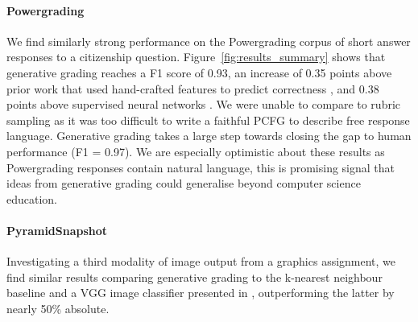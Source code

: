 
\paragraph{Powergrading}  We find similarly strong performance on the Powergrading corpus of short answer responses to a citizenship question. Figure~\ref{fig:results_summary} shows that generative grading reaches a F1 score of 0.93, an increase of 0.35 points above prior work that used hand-crafted features to predict correctness \cite{daxenberger2014dkpro}, and 0.38 points above supervised neural networks \cite{riordan2017investigating}. We were unable to compare to rubric sampling \cite{wu2018beyond} as it was too difficult to write a faithful PCFG to describe free response language. Generative grading takes a large step towards closing the gap to human performance (F1 = 0.97). We are especially optimistic about these results as Powergrading responses contain natural language, this is promising signal that ideas from generative grading could generalise beyond computer science education.

\paragraph{PyramidSnapshot} Investigating a third modality of image output from a graphics assignment, we find similar results comparing generative grading to the k-nearest neighbour baseline and a VGG image classifier presented in \cite{yan_pyramid}, outperforming the latter by nearly 50\% absolute.


